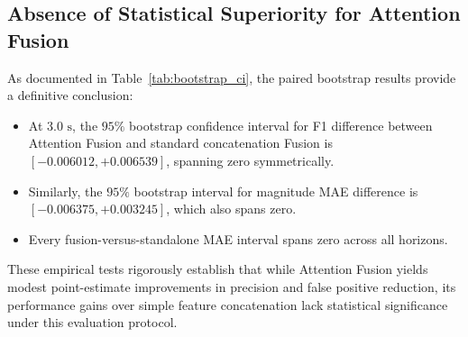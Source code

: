 \documentclass[journal]{IEEEtran}
\begin{document}
\begin{table}[t]
\caption{Paired Stratified Bootstrap Significance Testing ($N = 500$ Replicates, Common Test Cohort)}
\label{tab:bootstrap_ci}
\centering
{}
\end{table}

\subsection{Absence of Statistical Superiority for Attention Fusion}
As documented in Table~\ref{tab:bootstrap_ci}, the paired bootstrap results provide a definitive conclusion:
\begin{itemize}
    \item At $3.0\text{ s}$, the $95\%$ bootstrap confidence interval for F1 difference between Attention Fusion and standard concatenation Fusion is $[-0.006012, +0.006539]$, spanning zero symmetrically.
    \item Similarly, the $95\%$ bootstrap interval for magnitude MAE difference is $[-0.006375, +0.003245]$, which also spans zero.
    \item Every fusion-versus-standalone MAE interval spans zero across all horizons.
\end{itemize}
These empirical tests rigorously establish that while Attention Fusion yields modest point-estimate improvements in precision and false positive reduction, its performance gains over simple feature concatenation lack statistical significance under this evaluation protocol.
\end{document}
